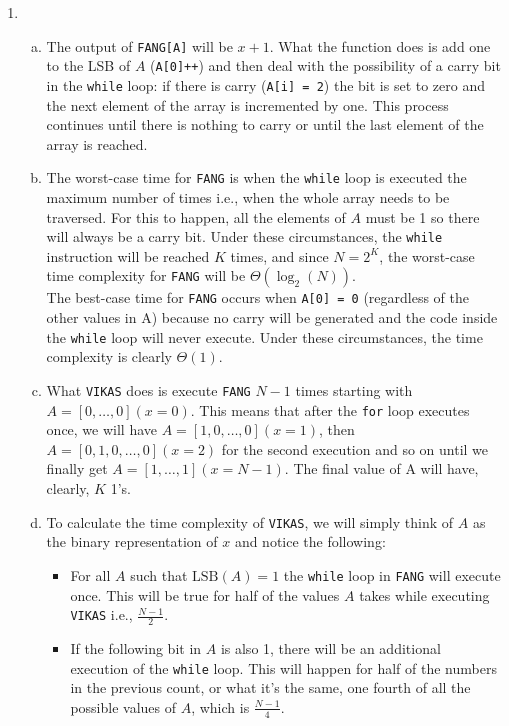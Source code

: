\documentclass{article}
\begin{document}
\begin{enumerate}[1.]
    \item 
    \begin{enumerate}[(a)]
        \item The output of \texttt{FANG[A]} will be $x + 1$. What the function does is add one to the LSB of $A$ (\texttt{A[0]++}) and then deal with the possibility of a carry bit in the \texttt{while} loop: if there is carry (\texttt{A[i] = 2}) the bit is set to zero and the next element of the array is incremented by one. This process continues until there is nothing to carry or until the last element of the array is reached.
        \item The worst-case time for \texttt{FANG} is when the \texttt{while} loop is executed the maximum number of times i.e., when the whole array needs to be traversed. For this to happen, all the elements of $A$ must be 1 so there will always be a carry bit. Under these circumstances, the \texttt{while} instruction will be reached $K$ times, and since $N = 2^K$, the worst-case time complexity for \texttt{FANG} will be $\Theta(\log_2(N))$.\\
        The best-case time for \texttt{FANG} occurs when \texttt{A[0] = 0} (regardless of the other values in A) because no carry will be generated and the code inside the \texttt{while} loop will never execute. Under these circumstances, the time complexity is clearly $\Theta(1)$.
        \item What \texttt{VIKAS} does is execute \texttt{FANG} $N-1$ times starting with $A = [0,\ldots,0] (x = 0)$. This means that after the \texttt{for} loop executes once, we will have $A = [1,0,\ldots,0] (x = 1)$, then $A = [0,1,0,\ldots,0] (x = 2)$ for the second execution and so on until we finally get $A = [1,\ldots,1] (x = N - 1)$. The final value of A will have, clearly, $K$ 1's.
        \item To calculate the time complexity of \texttt{VIKAS}, we will simply think of $A$ as the binary representation of $x$ and notice the following:
            \begin{itemize}
                \item For all $A$ such that $\text{LSB}(A) = 1$ the \texttt{while} loop in \texttt{FANG} will execute once. This will be true for half of the values $A$ takes while executing \texttt{VIKAS} i.e., $\frac{N-1}{2}$.
                \item If the following bit in $A$ is also 1, there will be an additional execution of the \texttt{while} loop. This will happen for half of the numbers in the previous count, or what it's the same, one fourth of all the possible values of $A$, which is $\frac{N-1}{4}$.

\end{itemize}
\end{enumerate}
\end{enumerate}
\end{document}
